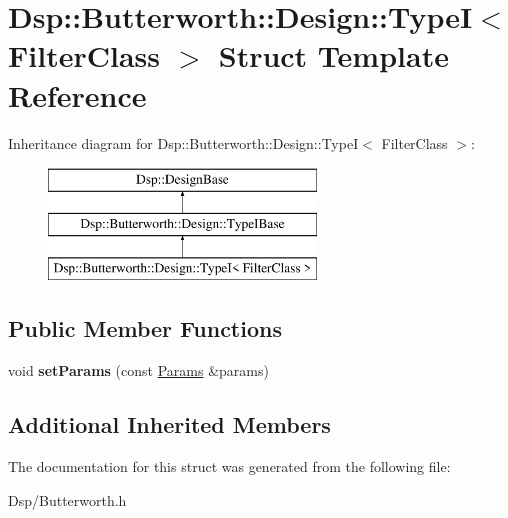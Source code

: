 \hypertarget{structDsp_1_1Butterworth_1_1Design_1_1TypeI}{\section{Dsp\-:\-:Butterworth\-:\-:Design\-:\-:Type\-I$<$ Filter\-Class $>$ Struct Template Reference}
\label{structDsp_1_1Butterworth_1_1Design_1_1TypeI}
}
Inheritance diagram for Dsp\-:\-:Butterworth\-:\-:Design\-:\-:Type\-I$<$ Filter\-Class $>$\-:\begin{figure}[H]
\begin{center}
\leavevmode
\includegraphics[height=3.000000cm]{structDsp_1_1Butterworth_1_1Design_1_1TypeI}
\end{center}
\end{figure}
\subsection*{Public Member Functions}
\begin{DoxyCompactItemize}
\item 
\hypertarget{structDsp_1_1Butterworth_1_1Design_1_1TypeI_a68e626c7716beea39e6984f1bdc5724d}{void {\bfseries set\-Params} (const \hyperlink{structDsp_1_1Params}{Params} \&params)}\label{structDsp_1_1Butterworth_1_1Design_1_1TypeI_a68e626c7716beea39e6984f1bdc5724d}

\end{DoxyCompactItemize}
\subsection*{Additional Inherited Members}


The documentation for this struct was generated from the following file\-:\begin{DoxyCompactItemize}
\item 
Dsp/Butterworth.\-h\end{DoxyCompactItemize}
